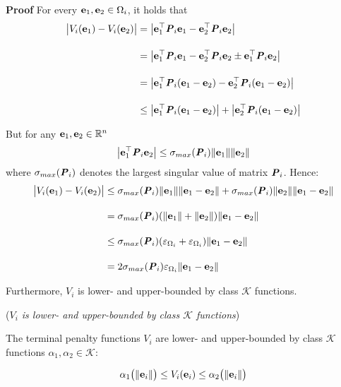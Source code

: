 \begin{gg_box}
\textbf{Proof} For every $\bm{\mathbf{e}}_1, \bm{\mathbf{e}}_2 \in \Omega_i$, it holds that
\begin{align}
  \big|V_i(\bm{\mathbf{e}}_1) - V_i(\bm{\mathbf{e}}_2)\big| &= \big|\bm{\mathbf{e}}_1^{\top} \bm{\mathit{P}}_i \bm{\mathbf{e}}_1 - \bm{\mathbf{e}}_2^{\top} \bm{\mathit{P}}_i \bm{\mathbf{e}}_2\big| \\[2.5ex]
    &= \big|\bm{\mathbf{e}}_1^{\top} \bm{\mathit{P}}_i \bm{\mathbf{e}}_1 - \bm{\mathbf{e}}_2^{\top} \bm{\mathit{P}}_i \bm{\mathbf{e}}_2 \pm \bm{\mathbf{e}}_1^{\top} \bm{\mathit{P}}_i \bm{\mathbf{e}}_2\big| \\[2.5ex]
    &= \big|\bm{\mathbf{e}}_1^{\top} \bm{\mathit{P}}_i (\bm{\mathbf{e}}_1 -\bm{\mathbf{e}}_2) - \bm{\mathbf{e}}_2^{\top} \bm{\mathit{P}}_i (\bm{\mathbf{e}}_1-\bm{\mathbf{e}}_2)\big| \\[2.5ex]
    &\leq \big|\bm{\mathbf{e}}_1^{\top} \bm{\mathit{P}}_i (\bm{\mathbf{e}}_1 -\bm{\mathbf{e}}_2)\big| + \big|\bm{\mathbf{e}}_2^{\top} \bm{\mathit{P}}_i (\bm{\mathbf{e}}_1-\bm{\mathbf{e}}_2)\big|
\end{align}

But for any $\bm{\mathbf{e}}_1, \bm{\mathbf{e}}_2 \in \mathbb{R}^n$
$$\big|\bm{\mathbf{e}}_1^{\top} \bm{\mathit{P}}_i \bm{\mathbf{e}}_2\big| \leq \sigma_{max}(\bm{\mathit{P}}_i) \|\bm{\mathbf{e}}_1\| \|\bm{\mathbf{e}}_2\|$$
where $\sigma_{max}(\bm{\mathit{P}}_i)$ denotes the largest singular value of matrix
$\bm{\mathit{P}}_i$. Hence:
\begin{align}
\big|V_i(\bm{\mathbf{e}}_1) - V_i(\bm{\mathbf{e}}_2)\big| &\leq
  \sigma_{max}(\bm{\mathit{P}}_i) \|\bm{\mathbf{e}}_1\| \|\bm{\mathbf{e}}_1 - \bm{\mathbf{e}}_2\| +
  \sigma_{max}(\bm{\mathit{P}}_i) \|\bm{\mathbf{e}}_2\| \|\bm{\mathbf{e}}_1 - \bm{\mathbf{e}}_2\| \\[2.5ex]
  &= \sigma_{max}(\bm{\mathit{P}}_i) (\|\bm{\mathbf{e}}_1\| + \|\bm{\mathbf{e}}_2\|)\|\bm{\mathbf{e}}_1 - \bm{\mathbf{e}}_2\| \\[2.5ex]
  & \leq \sigma_{max}(\bm{\mathit{P}}_i) (\varepsilon_{\Omega_i} + \varepsilon_{\Omega_i})\|\bm{\mathbf{e}}_1 - \bm{\mathbf{e}}_2\| \\[2.5ex]
  &= 2 \sigma_{max}(\bm{\mathit{P}}_i) \varepsilon_{\Omega_i} \|\bm{\mathbf{e}}_1 - \bm{\mathbf{e}}_2\|
\end{align}
\qedsymbol
\end{gg_box}

Furthermore, $V_i$ is lower- and upper-bounded by class $\mathcal{K}$ functions.

\begin{bw_box}
  \begin{lemma} (\textit{$V_i$ is lower- and upper-bounded by class
    $\mathcal{K}$ functions})
  \end{lemma}

  The terminal penalty functions $V_i$ are lower- and upper-bounded by
  class $\mathcal{K}$ functions $\alpha_1, \alpha_2 \in \mathcal{K}$:

  \begin{align}
    \alpha_1\big(\|\bm{\mathbf{e}}_i\|\big) \leq V_i(\bm{\mathbf{e}}_i) \leq \alpha_2\big(\| \bm{\mathbf{e}}_i \|\big)
  \end{align}

\end{bw_box}


